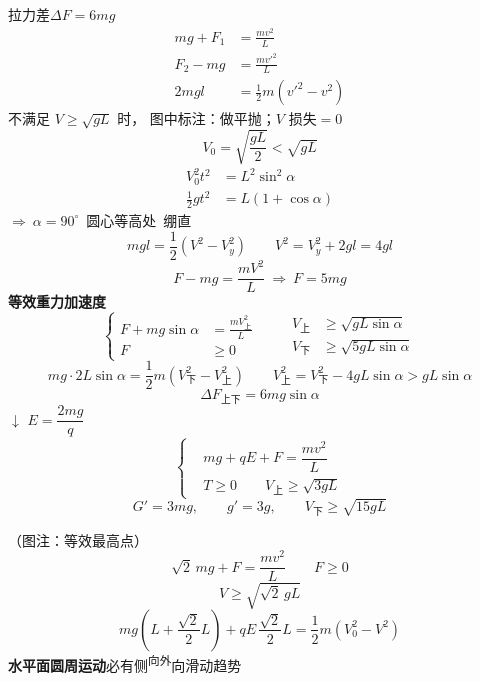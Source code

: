 \par 拉力差\quad $\Delta F=6mg$
\begin{align*}
mg+F_1&=\frac{mv^2}{L}\\
F_2-mg&=\frac{mv'^2}{L}\\
2mgl&=\frac{1}{2}m(v'^2-v^2)
\end{align*}
不满足 $V\ge\sqrt{gL}$ 时，
图中标注：做平抛；$V$ 损失$=0$
\[ V_0=\sqrt{\frac{gL}{2}}<\sqrt{gL} \]
\begin{align*}
V_0^2t^2&=L^2\sin^2\alpha\\
\frac{1}{2}gt^2&=L(1+\cos\alpha)
\end{align*}
$\Rightarrow\ \alpha=90^\circ$\ 圆心等高处\ 绷直
\[ mgl=\frac{1}{2}(V^2-V_y^2)\qquad V^2=V_y^2+2gl=4gl \] %
\[ F-mg=\frac{mV^2}{L}\ \Rightarrow\ F=5mg \]
\textbf{等效重力加速度}
\[ \left\{\begin{aligned}F+mg\sin\alpha&=\frac{mV_{\text{上}}^2}{L}\\ F&\ge0\end{aligned}\right. \qquad \begin{aligned}V_{\text{上}}&\ge\sqrt{gL\sin\alpha}\\ V_{\text{下}}&\ge\sqrt{5gL\sin\alpha}\end{aligned} \]
\[ mg\cdot2L\sin\alpha=\frac{1}{2}m(V_{\text{下}}^2-V_{\text{上}}^2)\qquad V_{\text{上}}^2=V_{\text{下}}^2-4gL\sin\alpha>gL\sin\alpha \] %
\[ \Delta F_{\text{上下}}=6mg\sin\alpha \]
$\downarrow$ $E=\dfrac{2mg}{q}$
\[
\left\{\begin{aligned}
&mg+qE+F=\dfrac{mv^2}{L}\\
&T\ge 0\qquad V_{\text{上}}\ge\sqrt{3gL}
\end{aligned}\right.
\]
\[ G'=3mg,\qquad g'=3g,\qquad V_{\text{下}}\ge\sqrt{15gL} \]

（图注：等效最高点）
\[ \sqrt2\,mg+F=\dfrac{mv^2}{L}\qquad F\ge 0 \]
\[ V\ge\sqrt{\sqrt2\,gL} \]
\[ mg\left(L+\dfrac{\sqrt2}{2}L\right)+qE\,\dfrac{\sqrt2}{2}L=\dfrac12m\left(V_0^2-V^2\right) \]
\textbf{水平面圆周运动}\quad 必有侧\textsuperscript{向外}向滑动趋势

